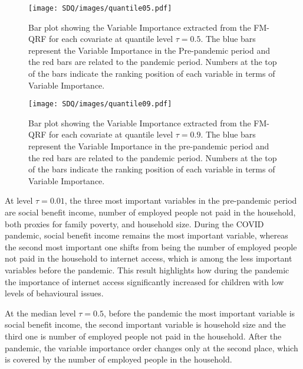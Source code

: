 \begin{figure}[H]
    \centering
    \texttt{[image: SDQ/images/quantile05.pdf]}
 \caption{Bar plot showing the Variable Importance extracted from the FM-QRF for each covariate at quantile level $\tau=0.5$. The blue bars represent the Variable Importance in the Pre-pandemic period and the red bars are related to the pandemic period. Numbers at the top of the bars indicate the ranking position of each variable in terms of Variable Importance.}
    \label{fig:quantile05}
\end{figure}

\begin{figure}[H]
    \centering
    \texttt{[image: SDQ/images/quantile09.pdf]}
     \caption{Bar plot showing the Variable Importance extracted from the FM-QRF for each covariate at quantile level $\tau=0.9$. The blue bars represent the Variable Importance in the pre-pandemic period and the red bars are related to the pandemic period. Numbers at the top of the bars indicate the ranking position of each variable in terms of Variable Importance.}
    \label{fig:quantile09}
\end{figure}


\vspace{0.15in}

\noindent At level $\tau=0.01$, the three most important variables in the pre-pandemic period are social benefit income, number of employed people not paid in the household, both proxies for family poverty, and household size.
During the COVID pandemic, social benefit income remains the most important variable, whereas the second most important one shifts from being the number of employed people not paid in the household to internet access, which is among the less important variables before the pandemic. This result highlights how during the pandemic the importance of internet access significantly increased for children with low levels of behavioural issues.

\vspace{0.15in}

\noindent At the median level $\tau=0.5$, before the pandemic the most important variable is social benefit income, the second important variable is household size and the third one is number of employed people not paid in the household. After the pandemic, the variable importance order changes only at the second place, which is covered by the number of employed people in the household.

\vspace{0.15in}

